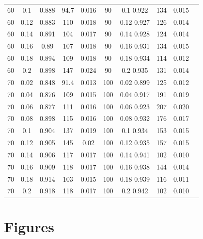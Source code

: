 \documentclass[12pt]{article}
\begin{document}
\begin{table}[h!]
\begin{tabular}{c c | c | c c ||c c | c | c c |}
			60	&	0.1	&	0.888	&	94.7	&	0.016	&	90	&	0.1	0.922	&	134	&	0.015\\ 
			60	&	0.12	&	0.883	&	110	&	0.018	&	90	&	0.12	0.927	&	126	&	0.014\\ 
			60	&	0.14	&	0.891	&	104	&	0.017	&	90	&	0.14	0.928	&	124	&	0.014\\ 
			60	&	0.16	&	0.89	&	107	&	0.018	&	90	&	0.16	0.931	&	134	&	0.015\\ 
			60	&	0.18	&	0.894	&	109	&	0.018	&	90	&	0.18	0.934	&	114	&	0.012\\ 
			60	&	0.2	&	0.898	&	147	&	0.024	&	90	&	0.2	0.935	&	131	&	0.014\\ 
			70	&	0.02	&	0.848	&	91.4	&	0.013	&	100	&	0.02	0.899	&	125	&	0.012\\ 
			70	&	0.04	&	0.876	&	109	&	0.015	&	100	&	0.04	0.917	&	191	&	0.019\\ 
			70	&	0.06	&	0.877	&	111	&	0.016	&	100	&	0.06	0.923	&	207	&	0.020\\ 
			70	&	0.08	&	0.898	&	115	&	0.016	&	100	&	0.08	0.932	&	176	&	0.017\\ 
			70	&	0.1	&	0.904	&	137	&	0.019	&	100	&	0.1	0.934	&	153	&	0.015\\ 
			70	&	0.12	&	0.905	&	145	&	0.02	&	100	&	0.12	0.935	&	157	&	0.015\\ 
			70	&	0.14	&	0.906	&	117	&	0.017	&	100	&	0.14	0.941	&	102	&	0.010\\ 
			70	&	0.16	&	0.909	&	118	&	0.017	&	100	&	0.16	0.938	&	144	&	0.014\\ 
			70	&	0.18	&	0.914	&	103	&	0.015	&	100	&	0.18	0.939	&	116	&	0.011\\ 
			70	&	0.2	&	0.918	&	118	&	0.017	&	100	&	0.2	0.942	&	102	&	0.010\\ 
			\hline
		\end{tabular}
		\end{table}


\section{Figures}
\end{document}
